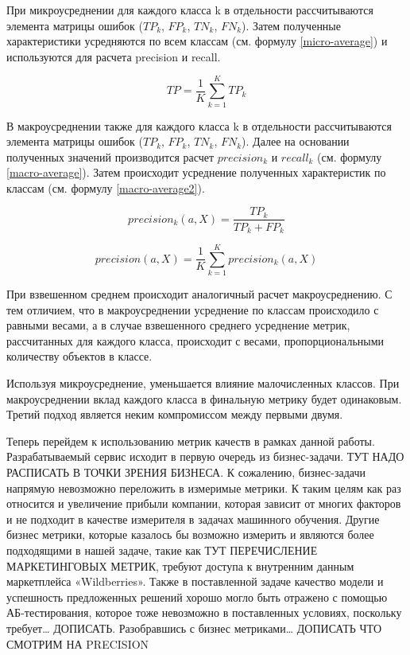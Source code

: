 \documentclass[a4paper,12pt]{extarticle}
\begin{document}
При микроусреднении для каждого класса k в отдельности рассчитываются элемента матрицы ошибок ($TP_k$, $FP_k$, $TN_k$, $FN_k$). Затем полученные характеристики усредняются по всем классам (см. формулу \ref{micro-average}) и используются для расчета precision и recall.

\begin{equation}
	\label{micro-average}
	TP = \frac{1}{K}\sum_{k=1}^{K}TP_k
\end{equation}

В макроусреднении также для каждого класса k в отдельности рассчитываются элемента матрицы ошибок ($TP_k$, $FP_k$, $TN_k$, $FN_k$). Далее на основании полученных значений производится расчет $precision_k$ и $recall_k$ (см. формулу \ref{macro-average}). Затем происходит усреднение полученных характеристик по классам (см. формулу \ref{macro-average2}).

\begin{equation}
	\label{macro-average}
	precision_k(a, X) = \frac{TP_k}{TP_k + FP_k}
\end{equation}

\begin{equation}
	\label{macro-average2}
	precision(a, X) = \frac{1}{K}\sum_{k=1}^{K}precision_k(a, X)
\end{equation}

При взвешенном среднем происходит аналогичный расчет макроусреднению. С тем отличием, что в макроусреднении усреднение по классам происходило с равными весами, а в случае взвешенного среднего усреднение метрик, рассчитанных для каждого класса, происходит с весами, пропорциональными количеству объектов в классе.

Используя микроусреднение, уменьшается влияние малочисленных классов. При макроусреднении вклад каждого класса в финальную метрику будет одинаковым. Третий подход является неким компромиссом между первыми двумя.

Теперь перейдем к использованию метрик качеств в рамках данной работы. Разрабатываемый сервис исходит в первую очередь из бизнес-задачи. ТУТ НАДО РАСПИСАТЬ В ТОЧКИ ЗРЕНИЯ БИЗНЕСА. К сожалению, бизнес-задачи напрямую невозможно переложить в измеримые метрики. К таким целям как раз относится и увеличение прибыли компании, которая зависит от многих факторов и не подходит в качестве измерителя в задачах машинного обучения. Другие бизнес метрики, которые казалось бы возможно измерить и являются более подходящими в нашей задаче, такие как ТУТ ПЕРЕЧИСЛЕНИЕ МАРКЕТИНГОВЫХ МЕТРИК, требуют доступа к внутренним данным маркетплейса «Wildberries». Также в поставленной задаче качество модели и успешность предложенных решений хорошо могло быть отражено с помощью АБ-тестирования, которое тоже невозможно в поставленных условиях, поскольку требует… ДОПИСАТЬ. Разобравшись с бизнес метриками…
ДОПИСАТЬ ЧТО СМОТРИМ НА PRECISION
\end{document}
